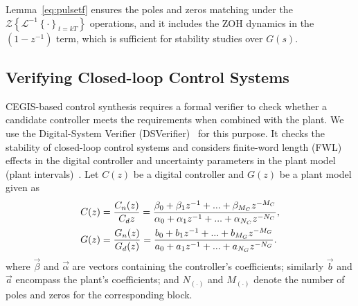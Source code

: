 \documentclass{sig-alternate-05-2015}
\newcommand{\red}[1]{{\color{red}#1}}
\begin{document}
Lemma~\ref{eq:pulsetf} ensures the poles and zeros matching under the 
$\mathcal{Z}\left\lbrace{\mathcal{L}^{-1}\left\lbrace{\cdot}\right\rbrace_{t=kT}}\right\rbrace$
operations, 
and it includes the ZOH dynamics in the $(1-z^{-1})$ term, 
which is sufficient for stability studies over $G(s)$.

\subsection{Verifying Closed-loop Control Systems}
\label{verifying-closed-loop-control-systems}




CEGIS-based control synthesis requires a formal verifier to check whether a
candidate controller meets the requirements when combined with the plant. 
We use the Digital-System Verifier (DSVerifier)~\cite{IsmailBCFF15} for this
purpose.  It checks the stability of closed-loop control systems and
considers finite-word length (FWL) effects in the digital controller and
uncertainty parameters in the plant model (plant intervals)~\cite{Bessa16}. 
Let $C(z)$ be a digital controller and $G(z)$ be a plant model given as
%
\begin{align}
\small
\label{controller_plant_tf}
C(z)&=\frac{C_n(z)}{C_d{z}}=\frac{\beta_{0}+\beta_{1}z^{-1}+...+\beta_{M_C}z^{-M_C}}{\alpha_{0}+\alpha_{1}z^{-1}+...+\alpha_{N_C}z^{-N_C}}, \\
G(z)&=\frac{G_n(z)}{G_d(z)}=\frac{b_{0}+b_{1}z^{-1}+...+b_{M_G}z^{-M_G}}{a_{0}+a_{1}z^{-1}+...+a_{N_G}z^{-N_G}}.
\end{align}
%
\noindent where $\vec{\beta}$ and $\vec{\alpha}$ are vectors containing the
controller's coefficients; similarly $\vec{b}$ and $\vec{a}$ encompass the
plant's coefficients; and $N_{(\cdot)}$ and $M_{(\cdot)}$ denote the number
of poles and zeros for the corresponding block.
\end{document}
